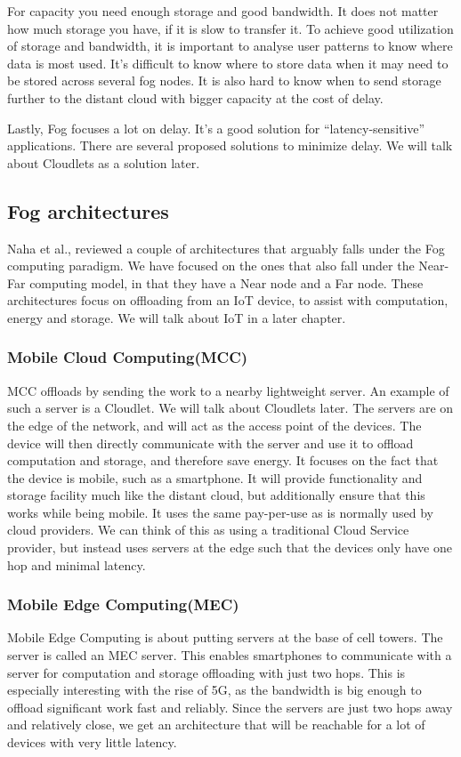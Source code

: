 For capacity you need enough storage and good bandwidth. It does not matter how much storage you have, if it is slow to transfer it. To achieve good utilization of storage and bandwidth, it is important to analyse user patterns to know where data is most used. It’s difficult to know where to store data when it may need to be stored across several fog nodes. It is also hard to know when to send storage further to the distant cloud with bigger capacity at the cost of delay. 

Lastly, Fog focuses a lot on delay. It’s a good solution for “latency-sensitive” applications. There are several proposed solutions to minimize delay. We will talk about Cloudlets as a solution later.

\subsection{Fog architectures}
Naha et al.\cite{naha_fog_2018}, reviewed a couple of architectures that arguably falls under the Fog computing paradigm. We have focused on the ones that also fall under the Near-Far computing model, in that they have a Near node and a Far node. These architectures focus on offloading from an IoT device, to assist with computation, energy and storage. We will talk about IoT in a later chapter. 

\subsubsection{Mobile Cloud Computing(MCC)}
MCC offloads by sending the work to a nearby lightweight server. An example of such a server is a Cloudlet. We will talk about Cloudlets later. The servers are on the edge of the network, and will act as the access point of the devices. The device will then directly communicate with the server and use it to offload computation and storage, and therefore save energy. It focuses on the fact that the device is mobile, such as a smartphone. It will provide functionality and storage facility much like the distant cloud, but additionally ensure that this works while being mobile. It uses the same pay-per-use as is normally used by cloud providers. We can think of this as using a traditional Cloud Service provider, but instead uses servers at the edge such that the devices only have one hop and minimal latency.

\subsubsection{Mobile Edge Computing(MEC)}
Mobile Edge Computing is about putting servers at the base of cell towers. The server is called an MEC server. This enables smartphones to communicate with a server for computation and storage offloading with just two hops. This is especially interesting with the rise of 5G, as the bandwidth is big enough to offload significant work fast and reliably. Since the servers are just two hops away and relatively close, we get an architecture that will be reachable for a lot of devices with very little latency.


